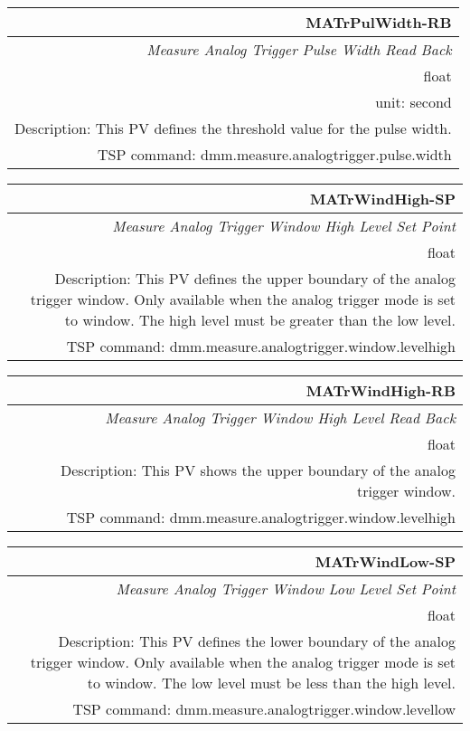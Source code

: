 \documentclass[openany]{article}
\begin{document}
		\begin{tabular}{N}
			\hline
			\bfseries MATrPulWidth-RB\label{pv:matrpulwidth-rb} \\ \hline
			\emph{Measure Analog Trigger Pulse Width Read Back} \\
			float \\
			unit: second \\
			Description: This PV defines the threshold value for the pulse width. \\
			TSP command: dmm.measure.analogtrigger.pulse.width
		\end{tabular}

		\begin{tabular}{N}
			\hline
			\bfseries MATrWindHigh-SP\label{pv:matrwindhigh-sp} \\ \hline
			\emph{Measure Analog Trigger Window High Level Set Point} \\
			float \\
			Description: This PV defines the upper boundary of the analog trigger window. Only available when the analog trigger mode is set to window. The high level must be greater than the low level. \\
			TSP command: dmm.measure.analogtrigger.window.levelhigh
		\end{tabular}

		\begin{tabular}{N}
			\hline
			\bfseries MATrWindHigh-RB\label{pv:matrwindhigh-rb} \\ \hline
			\emph{Measure Analog Trigger Window High Level Read Back} \\
			float \\
			Description: This PV shows the upper boundary of the analog trigger window. \\
			TSP command: dmm.measure.analogtrigger.window.levelhigh
		\end{tabular}

		\begin{tabular}{N}
			\hline
			\bfseries MATrWindLow-SP\label{pv:matrwindlow-sp} \\ \hline
			\emph{Measure Analog Trigger Window Low Level Set Point} \\
			float \\
			Description: This PV defines the lower boundary of the analog trigger window. Only available when the analog trigger mode is set to window. The low level must be less than the high level. \\
			TSP command: dmm.measure.analogtrigger.window.levellow
		\end{tabular}
\end{document}
